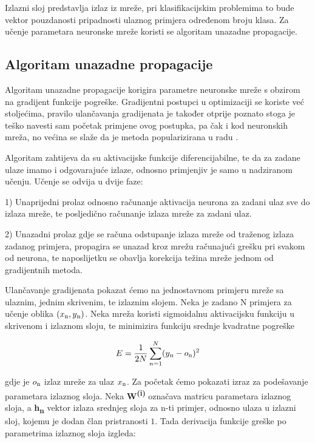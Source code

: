 \documentclass[times, utf8, diplomski]{fer}
\begin{document}
Izlazni sloj predstavlja izlaz iz mreže, pri klasifikacijskim problemima to bude vektor pouzdanosti pripadnosti ulaznog primjera određenom broju klasa. Za učenje parametara neuronske mreže koristi se algoritam unazadne propagacije. \par

\subsection{Algoritam unazadne propagacije}
Algoritam unazadne propagacije korigira parametre neuronske mreže s obzirom na gradijent funkcije pogreške. Gradijentni postupci u optimizaciji se koriste već stoljećima, pravilo ulančavanja gradijenata je također otprije poznato stoga je teško navesti sam početak primjene ovog postupka, pa čak i kod neuronskih mreža, no većina se slaže da je metoda popularizirana u radu \cite{backprop}. \par

Algoritam zahtijeva da su aktivacijske funkcije diferencijabilne, te da za zadane ulaze imamo i odgovarajuće izlaze, odnosno primjenjiv je samo u nadziranom učenju. Učenje se odvija u dvije faze:

1) Unaprijedni prolaz odnosno računanje aktivacija neurona za zadani ulaz sve do izlaza mreže, te posljedično računanje izlaza mreže za zadani ulaz.

2) Unazadni prolaz gdje se računa odstupanje izlaza mreže od traženog izlaza zadanog primjera, propagira se unazad kroz mrežu računajući grešku pri svakom od neurona, te naposlijetku se obavlja korekcija težina mreže jednom od gradijentnih metoda.

Ulančavanje gradijenata pokazat ćemo na jednostavnom primjeru mreže sa ulaznim, jednim skrivenim, te izlaznim slojem. Neka je zadano N primjera za učenje oblika $(x\textsubscript{n},y\textsubscript{n})$. Neka mreža koristi sigmoidalnu aktivacijsku funkciju u skrivenom i izlaznom sloju, te minimizira funkciju srednje kvadratne pogreške

\begin{equation}
	E=\frac{1}{2N}\sum_{n=1}^{N}(y\textsubscript{n} - o\textsubscript{n})^2
\end{equation}

gdje je $o\textsubscript{n}$ izlaz mreže za ulaz $x\textsubscript{n}$. Za početak ćemo pokazati izraz za podešavanje parametara izlaznog sloja. Neka \textbf{W\textsuperscript{(i)}} označava matricu parametara izlaznog sloja, a \textbf{h\textsubscript{n}} vektor izlaza srednjeg sloja za n-ti primjer, odnosno ulaza u izlazni sloj, kojemu je dodan član pristranosti $1$. Tada derivacija funkcije greške po parametrima izlaznog sloja izgleda:
\end{document}
